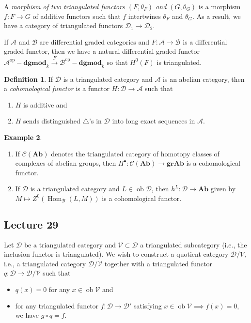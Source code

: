 \documentclass[10pt,letterpaper,cm]{nupset}
\theoremstyle{definition}
\newtheorem{definition}{Definition}[subsection]
\newtheorem{exmp}[definition]{Example}
\theoremstyle{theorem}
\theoremstyle{remark}
\newcommand{\1}{\mathbf{1}}
\renewcommand{\a}{\mathscr{A}}
\renewcommand{\b}{\mathscr{B}}
\renewcommand{\d}{\mathscr{D}}
\renewcommand{\v}{\mathscr{V}}
\newcommand{\0}{\vec 0}
\DeclareMathOperator{\op}{op}
\DeclareMathOperator{\ob}{ob}
\DeclareMathOperator{\Hom}{Hom}
\begin{document}
A \textit{morphism of two triangulated functors $\left(F, \theta_F\right)$ and $\left(G, \theta_G\right)$} is a morphism $f : F \to G$ of additive functors such that $f$ intertwines $\theta_F$ and $\theta_G$. As a result, we have a category of triangulated functors $\d_1 \to \d_2$. 

\smallskip

If $ \a$ and $\b$ are differential graded categories and $F: \a \to \b$ is a differential graded functor, then we have a natural differential graded functor $\a^{\op}{-}\mathbf{dgmod}_k \overset{F}{\longrightarrow} \b^{\op}{-}\mathbf{dgmod}_k$ so that $H^0(F)$ is triangulated.

\smallskip

\begin{definition}
If $\d$ is a triangulated category and $\a$ is an abelian category, then a \textit{cohomological functor} is a functor $H : \d \to \a$ such that 
\begin{enumerate}[label=(\roman*)]
\item $H$ is additive and
\item  $H$ sends distinguished $\triangle$'s in $\d$ into long exact sequences in $\a$.
\end{enumerate}
\end{definition}

\begin{exmp} $ $
\begin{enumerate}
\item If $\mathcal{C}(\mathbf{Ab})$ denotes the triangulated category of homotopy classes of complexes of abelian groups, then $H^{\bullet} : \mathcal{C}(\mathbf{Ab}) \to \mathbf{gr}\mathbf{Ab}$ is a cohomological functor.
\item If $\d$ is a triangulated category and $L \in \ob{\d}$, then $h^L : \d \to \mathbf{Ab}$ given by $M \mapsto Z^0(\Hom_{\b}(L, M))$ is a cohomological functor. 
\end{enumerate}
\end{exmp}

\subsection{Lecture 29}


Let $\d$ be a triangulated category and $\v \subset \d$ a triangulated subcategory (i.e., the inclusion functor is triangulated). We wish to construct a quotient category $\d/\v$, i.e., a triangulated category $\d/\v$ together with a triangulated functor $q : \d \to \d/\v$ such that 
\begin{itemize}
\item $q(x) = 0$ for any $x \in \ob{\v}$ and 
\item for any triangulated functor $f: \d \to \d'$ satisfying $x \in \ob{\v} \implies f(x) =0$, we have $g \circ q= f$.
\end{itemize}
\end{document}

